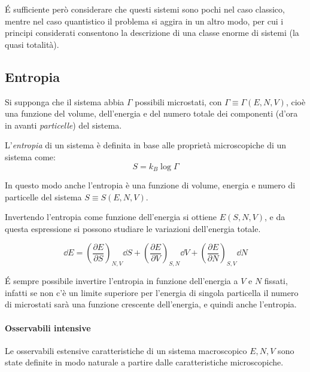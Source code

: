 \'E sufficiente però considerare che questi sistemi sono pochi nel caso classico, mentre nel caso quantistico il problema si aggira in un altro modo, per cui i principi considerati consentono la descrizione di una classe enorme di sistemi (la quasi totalità).

\subsection{Entropia}
\label{sec:entro}

Si supponga che il sistema abbia $\Gamma$ possibili microstati, con $\Gamma \equiv \Gamma(E,N,V)$, cioè una funzione del volume, dell'energia e del numero totale dei componenti (d'ora in avanti \textit{particelle}) del sistema.

\begin{defn}
	L'\textit{entropia} di un sistema è definita in base alle proprietà microscopiche di un sistema come:
	\begin{equation*}
	S = k_B \log\Gamma
	\end{equation*}
\end{defn}

In questo modo anche l'entropia è una funzione di volume, energia e numero di particelle del sistema $S \equiv S(E,N,V)$.

Invertendo l'entropia come funzione dell'energia si ottiene $E(S,N,V)$, e da questa espressione si possono studiare le variazioni dell'energia totale.

\begin{equation*}
	\dd E = \left(\frac{\partial E}{\partial S}\right)_{N,V} \dd S + \left(\frac{\partial E}{\partial V}\right)_{S,N} \dd V + \left(\frac{\partial E}{\partial N}\right)_{S,V} \dd N
\end{equation*}

\begin{note}[Invertibilità di $S(E,N,V)$]
	\'E sempre possibile invertire l'entropia in funzione dell'energia a $V$ e $N$ fissati, infatti se non c'è un limite superiore per l'energia di singola particella il numero di microstati sarà una funzione crescente dell'energia, e quindi anche l'entropia.
\end{note}

\paragraph{Osservabili intensive} Le osservabili estensive caratteristiche di un sistema macroscopico $E, N, V$ sono state definite in modo naturale a partire dalle caratteristiche microscopiche.

